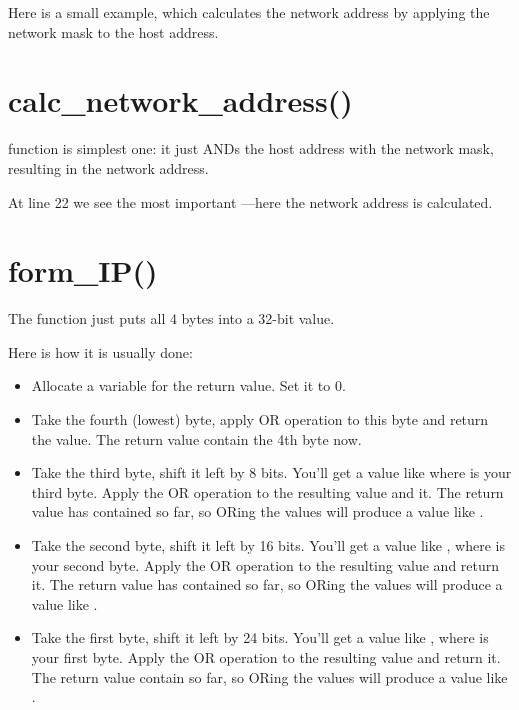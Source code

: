 Here is a small example, which calculates the network address by applying the network mask to the host address.



\section{calc\_network\_address()}

 function is simplest one: 
it just ANDs the host address with the network mask, resulting in the network address.



At line 22 we see the most important \AND---here the network address is calculated.

\section{form\_IP()}

The  function just puts all 4 bytes into a 32-bit value.

Here is how it is usually done:

\begin{itemize}
\item Allocate a variable for the return value.  Set it to 0.

\item Take the fourth (lowest) byte, apply OR operation to this byte and return the value.
The return value contain the 4th byte now.

\item Take the third byte, shift it left by 8 bits.
You'll get a value like  where  is your third byte.
Apply the OR operation to the resulting value and it.
The return value has contained  so far, so ORing the values will produce a value 
like .

\item Take the second byte, shift it left by 16 bits.
You'll get a value like , where  is your second byte.
Apply the OR operation to the resulting value and return it.
The return value has contained  so far, so ORing the values will produce
a value like .

\item Take the first byte, shift it left by 24 bits.
You'll get a value like , where  is your first byte.
Apply the OR operation to the resulting value and return it.
The return value contain  so far, so ORing the values will produce
a value like .

\end{itemize}

